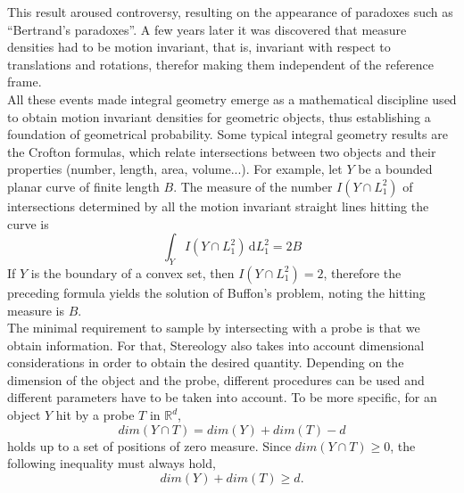This result aroused controversy, %
resulting on the appearance of paradoxes such as ``Bertrand's paradoxes''. A few years later it was discovered that measure densities had to be motion invariant, %
that is, invariant with respect to translations and rotations, therefor making them independent of the reference frame.\\

All these events made integral geometry emerge as a mathematical discipline used to obtain motion invariant densities for geometric objects, thus establishing a foundation of geometrical probability. Some typical integral geometry results are the Crofton formulas, which relate intersections between two objects and their properties (number, length, area, volume...). %
For example, let $Y$ be a bounded planar curve  of finite length $B$. The measure of the number $I(Y\cap L_1^2)$ of intersections determined by all the motion invariant straight lines hitting the curve is 
\begin{equation} \label{eq2}
    \int_{Y}  I(Y\cap L_1^2)\,\mathrm{d}L_1^2 = 2B
\end{equation}
If $Y$ is the boundary of a convex set, then $I(Y\cap L_1^2)=2$, therefore the preceding formula yields the solution of Buffon's problem, noting the hitting measure is $B$.\\

The minimal requirement to sample by intersecting with a probe is that we obtain information. For that,
Stereology also takes into account dimensional considerations in order to obtain the desired quantity. Depending on the dimension of the object and the probe, different procedures can be used and
different parameters have to be taken into account. To be more specific, for an object $Y$ hit by a probe $T$ in $\mathbb{R}^d$,
\begin{equation*}
    dim(Y\cap T) = dim(Y) + dim(T) - d
\end{equation*} 
holds up to a set of positions of zero measure. Since $dim(Y\cap T)\geq 0$, the following inequality must always hold,
\begin{equation}\label{eq1}
    dim(Y) + dim(T)\geq d.
\end{equation} 

